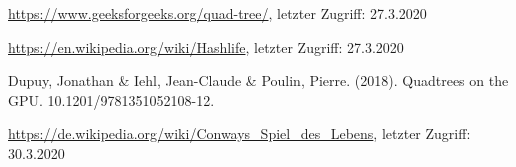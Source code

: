 \documentclass[runningheads]{llncs}
\begin{document}
\begin{thebibliography}{8}
    \url{https://www.geeksforgeeks.org/quad-tree/}, letzter Zugriff: 27.3.2020

    \url{https://en.wikipedia.org/wiki/Hashlife}, letzter Zugriff: 27.3.2020

    Dupuy, Jonathan \& Iehl, Jean-Claude \& Poulin, Pierre. (2018).
    Quadtrees on the GPU. 10.1201/9781351052108-12. 

    \url{https://de.wikipedia.org/wiki/Conways_Spiel_des_Lebens}, letzter Zugriff: 30.3.2020

\end{thebibliography}
\end{document}
